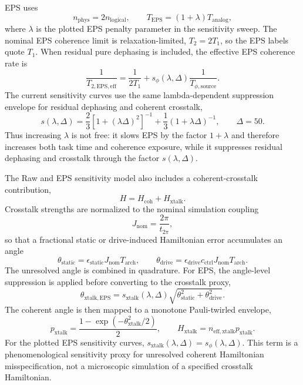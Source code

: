 \documentclass[%
10pt,tightenlines,
superscriptaddress,
 amsmath,amssymb,
 aps,
pra,
]{revtex4-2}
\begin{document}
EPS uses
\begin{equation}
    n_{\mathrm{phys}}=2n_{\mathrm{logical}},\qquad
    T_{\mathrm{EPS}}=(1+\lambda)T_{\mathrm{analog}},
\end{equation}
where $\lambda$ is the plotted EPS penalty parameter in the sensitivity sweep. The nominal EPS coherence limit is relaxation-limited, $T_2=2T_1$, so the EPS labels quote $T_1$. When residual pure dephasing is included, the effective EPS coherence rate is
\begin{equation}
    \frac{1}{T_{2,\mathrm{EPS,eff}}}
    =\frac{1}{2T_1}
    +s_\phi(\lambda,\Delta)\frac{1}{T_{\phi,\mathrm{source}}}.
\end{equation}
The current sensitivity curves use the same lambda-dependent suppression envelope for residual dephasing and coherent crosstalk,
\begin{equation}
    s(\lambda,\Delta)
    =\frac{2}{3}\left[1+(\lambda\Delta)^2\right]^{-1}
    +\frac{1}{3}(1+\lambda\Delta)^{-1},
    \qquad
    \Delta=50.
\end{equation}
Thus increasing $\lambda$ is not free: it slows EPS by the factor $1+\lambda$ and therefore increases both task time and coherence exposure, while it suppresses residual dephasing and crosstalk through the factor $s(\lambda,\Delta)$.

The Raw and EPS sensitivity model also includes a coherent-crosstalk contribution,
\begin{equation}
    H=H_{\mathrm{coh}}+H_{\mathrm{xtalk}}.
\end{equation}
Crosstalk strengths are normalized to the nominal simulation coupling
\begin{equation}
    J_{\mathrm{nom}}=\frac{2\pi}{t_{2\pi}},
\end{equation}
so that a fractional static or drive-induced Hamiltonian error accumulates an angle
\begin{equation}
    \theta_{\mathrm{static}}
    =\epsilon_{\mathrm{static}}J_{\mathrm{nom}}T_{\mathrm{arch}},
    \qquad
    \theta_{\mathrm{drive}}
    =\epsilon_{\mathrm{drive}}c_{\mathrm{ctrl}}J_{\mathrm{nom}}T_{\mathrm{arch}}.
\end{equation}
The unresolved angle is combined in quadrature. For EPS, the angle-level suppression is applied before converting to the crosstalk proxy,
\begin{equation}
    \theta_{\mathrm{xtalk,EPS}}
    =s_{\mathrm{xtalk}}(\lambda,\Delta)
    \sqrt{\theta_{\mathrm{static}}^2+\theta_{\mathrm{drive}}^2}.
\end{equation}
The coherent angle is then mapped to a monotone Pauli-twirled envelope,
\begin{equation}
    p_{\mathrm{xtalk}}
    =\frac{1-\exp(-\theta_{\mathrm{xtalk}}^2/2)}{2},
    \qquad
    H_{\mathrm{xtalk}}
    =n_{\mathrm{eff,xtalk}}p_{\mathrm{xtalk}}.
\end{equation}
For the plotted EPS sensitivity curves, $s_{\mathrm{xtalk}}(\lambda,\Delta)=s_\phi(\lambda,\Delta)$. This term is a phenomenological sensitivity proxy for unresolved coherent Hamiltonian misspecification, not a microscopic simulation of a specified crosstalk Hamiltonian.
\end{document}
